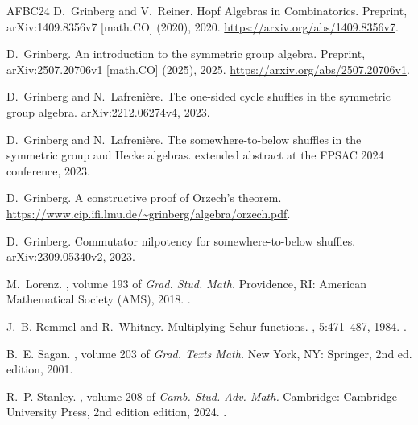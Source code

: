 \documentclass[numbers=enddot,12pt,final,onecolumn,notitlepage]{scrartcl}%
\theoremstyle{definition}
\begin{document}
\begin{thebibliography}{AFBC{\etalchar{+}}24}
D.~Grinberg and V.~Reiner.
\newblock Hopf {Algebras} in {Combinatorics}.
\newblock Preprint, {arXiv}:1409.8356v7 [math.{CO}] (2020), 2020.
\newblock \urlprefix\url{https://arxiv.org/abs/1409.8356v7}.

D.~Grinberg.
\newblock An introduction to the symmetric group algebra.
\newblock Preprint, {arXiv}:2507.20706v1 [math.{CO}] (2025), 2025.
\newblock \urlprefix\url{https://arxiv.org/abs/2507.20706v1}.

D.~Grinberg and N.~Lafreni\`ere.
\newblock The one-sided cycle shuffles in the symmetric group algebra.
\newblock arXiv:2212.06274v4, 2023.

D.~Grinberg and N.~Lafreni\`ere.
\newblock The somewhere-to-below shuffles in the symmetric group and {H}ecke
  algebras.
\newblock extended abstract at the FPSAC 2024 conference, 2023.

D.~Grinberg.
\newblock A constructive proof of {O}rzech's theorem.
\newblock
  \urlprefix\url{https://www.cip.ifi.lmu.de/~grinberg/algebra/orzech.pdf}.

D.~Grinberg.
\newblock Commutator nilpotency for somewhere-to-below shuffles.
\newblock arXiv:2309.05340v2, 2023.

M.~Lorenz.
, volume 193 of {\em Grad. Stud.
  Math.}
\newblock Providence, RI: American Mathematical Society (AMS), 2018.
\newblock {}.

J.~B. Remmel and R.~Whitney.
\newblock Multiplying {Schur} functions.
, 5:471--487, 1984.
\newblock {}.

B.~E. Sagan.
, volume 203 of {\em Grad. Texts Math.}
\newblock New York, NY: Springer, 2nd ed. edition, 2001.

R.~P. Stanley.
, volume 208 of {\em Camb. Stud. Adv. Math.}
\newblock Cambridge: Cambridge University Press, 2nd edition edition, 2024.
\newblock {}.

\end{thebibliography}
\end{document}
